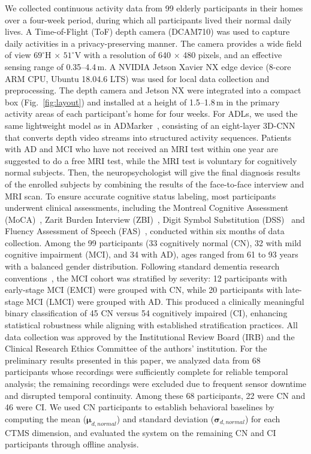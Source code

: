 \documentclass[sigconf, anonymous, 9pt, nonacm]{acmart}
\begin{document}
We collected continuous activity data from 99 elderly participants in their homes over a four-week period, during which all participants lived their normal daily lives. A Time-of-Flight (ToF) depth camera (DCAM710) was used to capture daily activities in a privacy-preserving manner. The camera provides a wide field of view $69^{\circ}$H $\times$ $51^{\circ}$V with a resolution of 640 $\times$ 480 pixels, and an effective sensing range of 0.35–4.4\,m. A NVIDIA Jetson Xavier NX edge device (8-core ARM CPU, Ubuntu 18.04.6 LTS) was used for local data collection and preprocessing. The depth camera and Jetson NX were integrated into a compact box (Fig.~\ref{fig:layout}) and installed at a height of 1.5–1.8\,m in the primary activity areas of each participant's home for four weeks.
For ADLs, we used the same lightweight model as in ADMarker~\cite{ouyang2024ADMarker}, consisting of an eight-layer 3D-CNN that converts depth video streams into structured activity sequences. Patients with AD and MCI who have not received
an MRI test within one year are suggested to do a free MRI
test, while the MRI test is voluntary for cognitively normal
subjects. Then, the neuropsychologist will give the final diagnosis results of the enrolled subjects by combining the
results of the face-to-face interview and MRI scan.
To ensure accurate cognitive status labeling, most participants underwent clinical assessments, including the Montreal Cognitive Assessment (MoCA)~\cite{Nasreddine2005MoCA}, Zarit Burden Interview (ZBI)~\cite{Zarit1980ZBI}, Digit Symbol Substitution (DSS)~\cite{Loreck1994DSS} and Fluency Assessment of Speech (FAS)~\cite{FAS}, conducted within six months of data collection.
Among the 99 participants (33 cognitively normal (CN), 32 with mild cognitive impairment (MCI), and 34 with AD), ages ranged from 61 to 93 years with a balanced gender distribution. Following standard dementia research conventions~\cite{Petersen2001MCI, Aisen2010ADNI}, the MCI cohort was stratified by severity: 12 participants with early-stage MCI (EMCI) were grouped with CN, while 20 participants with late-stage MCI (LMCI) were grouped with AD. This produced a clinically meaningful binary classification of 45 CN versus 54 cognitively impaired (CI), enhancing statistical robustness while aligning with established stratification practices.
All data collection was approved by the Institutional Review Board (IRB) and the Clinical Research Ethics Committee of the authors' institution. For the preliminary results presented in this paper, we analyzed data from 68 participants whose recordings were sufficiently complete for reliable temporal analysis; the remaining recordings were excluded due to frequent sensor downtime and disrupted temporal continuity. Among these 68 participants, 22 were CN and 46 were CI. We used CN participants to establish behavioral baselines by computing the mean ($\boldsymbol{\mu}_{d,normal}$) and standard deviation ($\boldsymbol{\sigma}_{d,normal}$) for each CTMS dimension, and evaluated the system on the remaining CN and CI participants through offline analysis.
\end{document}

